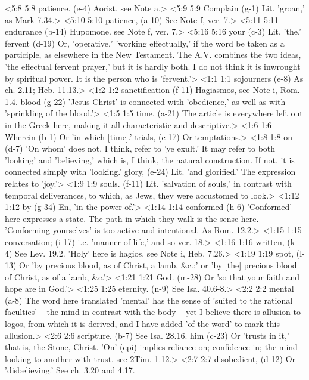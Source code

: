 <5:8 5:8  patience. (e-4)  Aorist. see Note a.>
<5:9 5:9  Complain (g-1)  Lit. 'groan,' as Mark 7.34.>
<5:10 5:10  patience, (a-10)  See Note f, ver. 7.>
<5:11 5:11  endurance (b-14)  Hupomone. see Note f, ver. 7.>
<5:16 5:16  your (c-3)  Lit. 'the.'
  fervent (d-19)  Or, 'operative,' 'working effectually,' if the word be taken  as a participle, as elsewhere in the New Testament. The A.V.  combines the two ideas, 'the effectual fervent prayer,' but it  is hardly both. I do not think it is inwrought by spiritual  power. It is the person who is 'fervent.'>
<1:1 1:1  sojourners (e-8)  As ch. 2.11; Heb. 11.13.>
<1:2 1:2  sanctification (f-11)  Hagiasmos, see Note i, Rom. 1.4.
  blood (g-22)  'Jesus Christ' is connected with 'obedience,' as well as with  'sprinkling of the blood.'>
<1:5 1:5  time. (a-21)  The article is everywhere left out in the Greek here, making  it all characteristic and descriptive.>
<1:6 1:6  Wherein (b-1)  Or 'in which [time].'
  trials, (c-17)  Or temptations.>
<1:8 1:8  on (d-7)  'On whom' does not, I think, refer to 'ye exult.' It may  refer to both 'looking' and 'believing,' which is, I think, the  natural construction. If not, it is connected simply with  'looking.'
  glory, (e-24)  Lit. 'and glorified.' The expression relates to 'joy.'>
<1:9 1:9  souls. (f-11)  Lit. 'salvation of souls,' in contrast with temporal  deliverances, to which, as Jews, they were accustomed to look.>
<1:12 1:12  by (g-34)  En, 'in the power of.'>
<1:14 1:14  conformed (h-6)  'Conformed' here expresses a state. The path in which they  walk is the sense here. 'Conforming yourselves' is too active  and intentional. As Rom. 12.2.>
<1:15 1:15  conversation; (i-17)  i.e. 'manner of life,' and so ver. 18.>
<1:16 1:16  written, (k-4)  See Lev. 19.2. 'Holy' here is hagios. see Note i, Heb. 7.26.>
<1:19 1:19  spot, (l-13)  Or 'by precious blood, as of Christ, a lamb, &c.;' or 'by  [the] precious blood of Christ, as of a lamb, &c.'>
<1:21 1:21  God. (m-28)  Or 'so that your faith and hope are in God.'>
<1:25 1:25  eternity. (n-9)  See Isa. 40.6-8.>
<2:2 2:2  mental (a-8)  The word here translated 'mental' has the sense of 'suited to  the rational faculties' -- the mind in contrast with the body  -- yet I believe there is allusion to logos, from which it is  derived, and I have added 'of the word' to mark this allusion.>
<2:6 2:6  scripture. (b-7)  See Isa. 28.16.
  him (c-23)  Or 'trusts in it,' that is, the Stone, Christ. 'On' (epi)  implies reliance on; confidence in; the mind looking to another  with trust. see 2Tim. 1.12.>
<2:7 2:7  disobedient, (d-12)  Or 'disbelieving.' See ch. 3.20 and 4.17.
